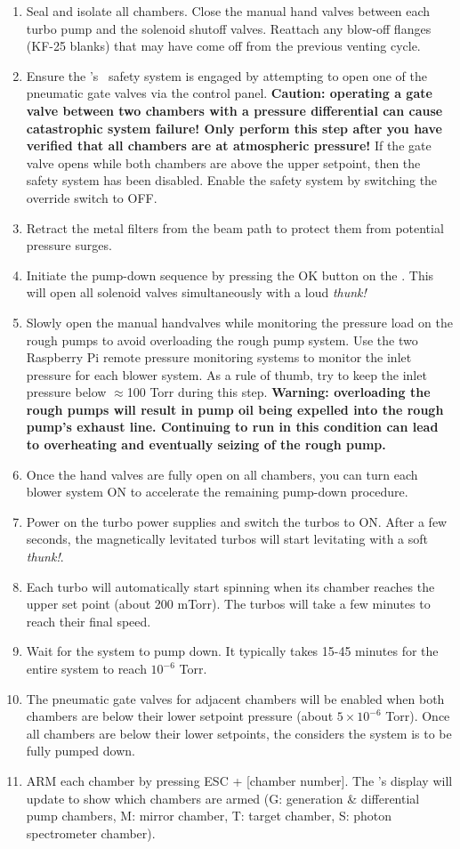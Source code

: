 \begin{enumerate}
	\item Seal and isolate all chambers. Close the manual hand valves between each turbo pump and the solenoid shutoff valves. Reattach any blow-off flanges (KF-25 blanks) that may have come off from the previous venting cycle.
	\item Ensure the \OMRON's \, safety system is engaged by attempting to open one of the pneumatic gate valves via the control panel. \textbf{Caution: operating a gate valve between two chambers with a pressure differential can cause catastrophic system failure! Only perform this step after you have verified that all chambers are at atmospheric pressure!} If the gate valve opens while both chambers are above the upper setpoint, then the \OMRON \, safety system has been disabled. Enable the safety system by switching the override switch to OFF.
	\item Retract the metal filters from the beam path to protect them from potential pressure surges. 
	\item Initiate the pump-down sequence by pressing the OK button on the \OMRON. This will open all solenoid valves simultaneously with a loud \textit{thunk!}
	\item Slowly open the manual handvalves while monitoring the pressure load on the rough pumps to avoid overloading the rough pump system. Use the two Raspberry Pi remote pressure monitoring systems to monitor the inlet pressure for each blower system. As a rule of thumb, try to keep the inlet pressure below $\approx$100 Torr during this step. \textbf{Warning: overloading the rough pumps will result in pump oil being expelled into the rough pump's exhaust line. Continuing to run in this condition can lead to overheating and eventually seizing of the rough pump.}
	\item Once the hand valves are fully open on all chambers, you can turn each blower system ON to accelerate the remaining pump-down procedure.
	\item Power on the turbo power supplies and switch the turbos to ON. After a few seconds, the magnetically levitated turbos will start levitating with a soft \textit{thunk!}.
	\item Each turbo will automatically start spinning when its chamber reaches the upper set point (about 200 mTorr). The turbos will take a few minutes to reach their final speed.
	\item Wait for the system to pump down. It typically takes 15-45 minutes for the entire system to reach $10^{-6}$ Torr.
	\item The pneumatic gate valves for adjacent chambers will be enabled when both chambers are below their lower setpoint pressure (about $5 \times 10^{-6}$ Torr). Once all chambers are below their lower setpoints, the \OMRON considers the system is to be fully pumped down.
	\item ARM each chamber by pressing ESC + [chamber number]. The \OMRON's display will update to show which chambers are armed (G: generation \& differential pump chambers, M: mirror chamber, T: target chamber, S: photon spectrometer chamber).
\end{enumerate}

